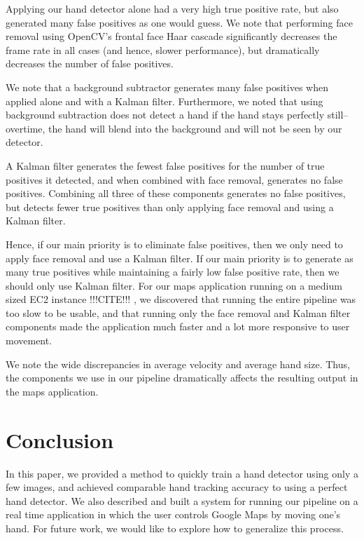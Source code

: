 \documentclass[12pt]{article}
\begin{document}
Applying our hand detector alone had a very high true positive rate, but also generated many false positives as one would guess. We note that performing face removal using OpenCV's frontal face Haar cascade significantly decreases the frame rate in all cases (and hence, slower performance), but dramatically decreases the number of false positives. 

We note that a background subtractor generates many false positives when applied alone and with a Kalman filter. Furthermore, we noted that using background subtraction does not detect a hand if the hand stays perfectly still--overtime, the hand will blend into the background and will not be seen by our detector. 

A Kalman filter generates the fewest false positives for the number of true positives it detected, and when combined with face removal, generates no false positives. Combining all three of these components generates no false positives, but detects fewer true positives than only applying face removal and using a Kalman filter. 

Hence, if our main priority is to eliminate false positives, then we only need to apply face removal and use a Kalman filter. If our main priority is to generate as many true positives while maintaining a fairly low false positive rate, then we should only use Kalman filter. For our maps application running on a medium sized EC2 instance !!!CITE!!! , we discovered that running the entire pipeline was too slow to be usable, and that running only the face removal and Kalman filter components made the application much faster and a lot more responsive to user movement.

We note the wide discrepancies in average velocity and average hand size. Thus, the components we use in our pipeline dramatically affects the resulting output in the maps application.


\section{Conclusion}

In this paper, we provided a method to quickly train a hand detector using only a few images, and achieved comparable hand tracking accuracy to using a perfect hand detector. We also described and built a system for running our pipeline on a real time application in which the user controls Google Maps by moving one's hand. For future work, we would like to explore how to generalize this process. 
\end{document}
